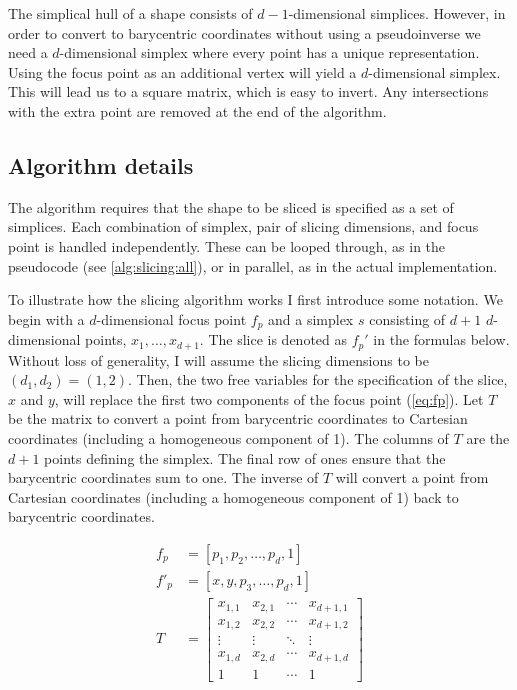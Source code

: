 The simplical hull of a shape consists of $d−1$-dimensional simplices. However, in
order to convert to barycentric coordinates without using a pseudoinverse we
need a $d$-dimensional simplex where every point has a unique representation.
Using the focus point as an additional vertex will yield a $d$-dimensional 
simplex.
This will lead us to a square matrix, which is easy to
invert.  Any intersections with the extra point are removed at the end of the
algorithm.

\subsection{Algorithm details}

The algorithm requires that the shape to be sliced is specified as a set of
simplices. Each combination of simplex, pair of slicing dimensions, and focus
point is handled independently. These can be looped through, as in the
pseudocode (see \autoref{alg:slicing:all}), or in parallel, as in the actual
implementation.

To illustrate how the slicing algorithm works I first introduce some notation.  
We begin with a $d$-dimensional focus point $f_p$ and a simplex $s$
consisting of $d+1$ $d$-dimensional points, $x_1, \ldots, x_{d+1}$. 
The slice is denoted as $f_p'$ in the formulas below. Without loss of generality, 
I will
assume the slicing dimensions to be $(d_1,d_2)=(1,2)$. Then, the two free
variables for the specification of the slice, $x$ and $y$, will replace the
first two components of the focus point (\autoref{eq:fp}). 
Let $T$
be the matrix to convert a point from barycentric coordinates to Cartesian
coordinates (including a homogeneous component of 1). The columns of $T$ are the $d+1$ points defining the simplex. The final row
of ones ensure that the barycentric coordinates sum to one. The inverse
of $T$ will convert a point from Cartesian coordinates (including a homogeneous component of 1) back to barycentric coordinates.

\begin{align}
  f_p &= [p_1, p_2, \ldots, p_d,1] \\
  f'_p &= [x, y, p_3, \ldots, p_d, 1] \label{eq:fp} \\
  T &= 
    \begin{bmatrix}
      x_{1,1} & x_{2,1} & \cdots & x_{d+1,1} \\
      x_{1,2} & x_{2,2} & \cdots & x_{d+1,2} \\
      \vdots  & \vdots  & \ddots & \vdots    \\
      x_{1,d} & x_{2,d} & \cdots & x_{d+1,d} \\
      1       & 1       & \cdots & 1         
    \end{bmatrix} \\
\end{align}

